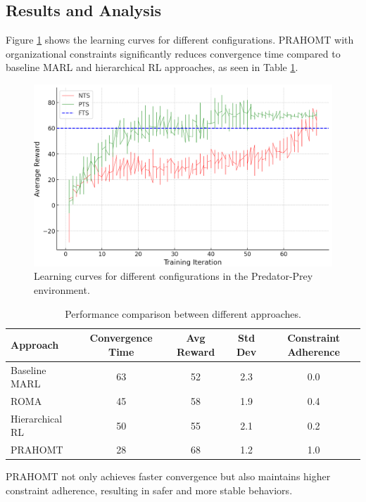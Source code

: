 \documentclass[sigconf,anonymous]{aamas}
\begin{document}
\subsection{Results and Analysis}
\label{sec:results}
Figure \ref{fig:learning-curves} shows the learning curves for different configurations. PRAHOMT with organizational constraints significantly reduces convergence time compared to baseline MARL and hierarchical RL approaches, as seen in Table \ref{tab:results}.

\begin{figure}[h]
    \centering
    \includegraphics[width=0.8\linewidth]{figures/penalize_learning_curves.png}
    \caption{Learning curves for different configurations in the Predator-Prey environment.}
    \label{fig:learning-curves}
\end{figure}

\begin{table}[h]
    \centering
    \caption{Performance comparison between different approaches.}
    \begin{tabular}{lcccc}
    \toprule
    Approach & Convergence Time & Avg Reward & Std Dev & Constraint Adherence \\
    \midrule
    Baseline MARL & 63 & 52 & 2.3 & 0.0 \\
    ROMA & 45 & 58 & 1.9 & 0.4 \\
    Hierarchical RL & 50 & 55 & 2.1 & 0.2 \\
    PRAHOMT & 28 & 68 & 1.2 & 1.0 \\
    \bottomrule
    \end{tabular}
    \label{tab:results}
\end{table}

PRAHOMT not only achieves faster convergence but also maintains higher constraint adherence, resulting in safer and more stable behaviors.
\end{document}
